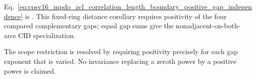 \documentclass{article}
\begin{document}
Eq.~\ref{eq:cpsv16_mpdo_zcl_correlation_length_boundary_positive_gap_independence}
is .
This fixed-ring distance corollary requires positivity of the four compared
complementary gaps; equal gap sums give the nonadjacent-on-both-arcs CID
specialization.

The scope restriction is resolved by requiring positivity precisely for each
gap exponent that is varied. No invariance replacing a zeroth power by a
positive power is claimed.



\end{document}
